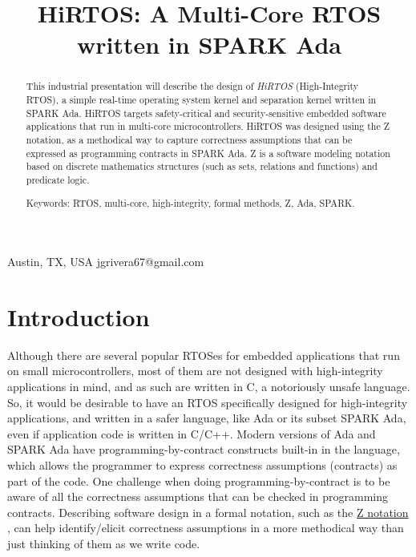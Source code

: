 \documentclass{AUJarticle}
\begin{document}
\title{HiRTOS: A Multi-Core RTOS written in SPARK Ada}

{Austin, TX, USA}
{jgrivera67@gmail.com}



\thispagestyle{plain}

\maketitle

\begin{abstract}

This industrial presentation will describe the design of \emph{HiRTOS} (High-Integrity RTOS),
a simple real-time operating system kernel and separation kernel written in SPARK Ada.
HiRTOS targets safety-critical and security-sensitive embedded software applications
that run in multi-core microcontrollers.
HiRTOS was designed using the Z notation,
as a methodical way to capture correctness assumptions that can be expressed
as programming contracts in SPARK Ada. Z is a software modeling notation based
on discrete mathematics structures (such as sets, relations and functions)
and predicate logic.

Keywords: RTOS, multi-core, high-integrity, formal methods, Z, Ada, SPARK.

\end{abstract}

\section{Introduction}

Although there are several popular RTOSes for embedded applications that run on small
microcontrollers, most of them are not designed with high-integrity applications
in mind, and as such are written in C, a notoriously unsafe language. So, it would be desirable
to have an RTOS specifically designed for high-integrity applications, and written in a safer
language, like Ada or its subset SPARK Ada, even if application code is written in C/C++.
Modern versions of Ada and SPARK Ada have programming-by-contract constructs built-in
in the language, which allows the programmer to express correctness assumptions (contracts) as
part of the code. One challenge when doing programming-by-contract is to be aware of all the
correctness assumptions that can be checked in programming contracts. Describing software design
in a formal notation, such as the \href{http://en.wikipedia.org/wiki/Z_notation}{Z notation} \cite{Zrm, WayofZ},
can help identify/elicit correctness assumptions in a more methodical way than just thinking
of them as we write code.
\end{document}
